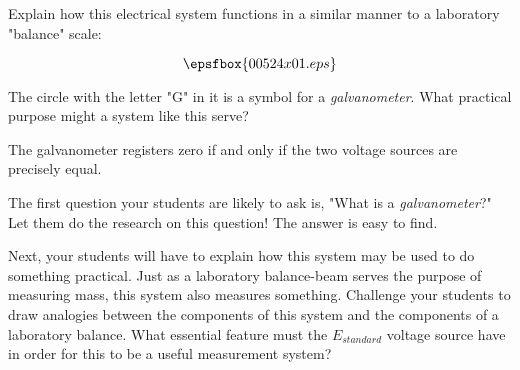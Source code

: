 

Explain how this electrical system functions in a similar manner to a laboratory "balance" scale:

$$\epsfbox{00524x01.eps}$$

The circle with the letter "G" in it is a symbol for a {\it galvanometer}.  What practical purpose might a system like this serve?







The galvanometer registers zero if and only if the two voltage sources are precisely equal.







The first question your students are likely to ask is, "What is a {\it galvanometer}?"  Let them do the research on this question!  The answer is easy to find.

Next, your students will have to explain how this system may be used to do something practical.  Just as a laboratory balance-beam serves the purpose of measuring mass, this system also measures something.  Challenge your students to draw analogies between the components of this system and the components of a laboratory balance.  What essential feature must the $E_{standard}$ voltage source have in order for this to be a useful measurement system?




